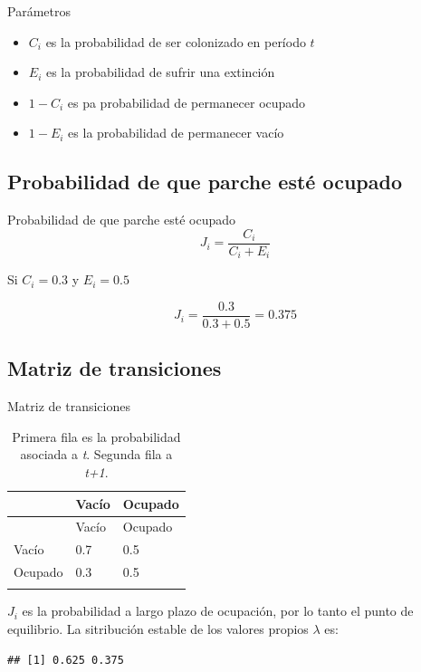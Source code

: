 \documentclass[
  11pt,
  ignorenonframetext,
]{beamer}
\begin{document}
\begin{frame}{Parámetros}
\begin{itemize}
\item
  \(C_i\) es la probabilidad de ser colonizado en período \(t\)
\item
  \(E_i\) es la probabilidad de sufrir una extinción
\item
  \(1-C_i\) es pa probabilidad de permanecer ocupado
\item
  \(1 - E_i\) es la probabilidad de permanecer vacío
\end{itemize}
\end{frame}

\hypertarget{probabilidad-de-que-parche-estuxe9-ocupado}{%
\subsection{Probabilidad de que parche esté
ocupado}\label{probabilidad-de-que-parche-estuxe9-ocupado}}

\begin{frame}{Probabilidad de que parche esté ocupado}
\begin{equation}
J_i = \frac{C_i}{C_i + E_i}
\end{equation}

Si \(C_i = 0.3\) y \(E_i = 0.5\)

\begin{equation}
J_i = \frac{0.3}{0.3 + 0.5} = 0.375
\end{equation}
\end{frame}

\hypertarget{matriz-de-transiciones}{%
\subsection{Matriz de transiciones}\label{matriz-de-transiciones}}

\begin{frame}[fragile]{Matriz de transiciones}
\begin{longtable}[]{@{}lll@{}}
\caption{Primera fila es la probabilidad asociada a \emph{t}. Segunda
fila a \emph{t+1}.}\tabularnewline
\toprule\noalign{}
& Vacío & Ocupado \\
\midrule\noalign{}
\endfirsthead
\toprule\noalign{}
& Vacío & Ocupado \\
\midrule\noalign{}
\endhead
Vacío & 0.7 & 0.5 \\
Ocupado & 0.3 & 0.5 \\
\bottomrule\noalign{}
\end{longtable}

\(J_i\) es la probabilidad a largo plazo de ocupación, por lo tanto el
punto de equilibrio. La sitribución estable de los valores propios
\(\lambda\) es:

\begin{verbatim}
## [1] 0.625 0.375
\end{verbatim}
\end{frame}
\end{document}
